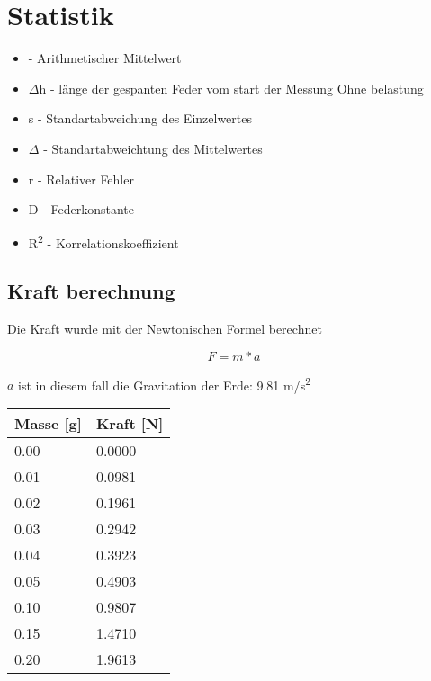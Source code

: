 \documentclass[../main.tex]{subfiles} %
\begin{document}
\section{Statistik}\label{sec:statistik}

\begin{itemize}ß
    \item {} - Arithmetischer Mittelwert
    \item $\Delta$h - länge der gespanten Feder vom start der Messung Ohne belastung
    \item s - Standartabweichung des Einzelwertes
    \item $\Delta$ - Standartabweichtung des Mittelwertes
    \item r - Relativer Fehler
    \item D - Federkonstante
    \item R\textsuperscript{2} - Korrelationskoeffizient
\end{itemize}

\subsection{Kraft berechnung}\label{subsec:force-calculation}

Die Kraft wurde mit der Newtonischen Formel berechnet

$$ F = m * a $$

$a$ ist in diesem fall die Gravitation der Erde: 9.81 m/s\textsuperscript{2}

\begin{center}
    \begin{tabular}{ |l|l| } \hline\rowcolor{Gray!50}
        Masse [g] & Kraft [N] \\\hline
        0.00      & 0.0000    \\\hline
        0.01      & 0.0981    \\\hline
        0.02      & 0.1961    \\\hline
        0.03      & 0.2942    \\\hline
        0.04      & 0.3923    \\\hline
        0.05      & 0.4903    \\\hline
        0.10      & 0.9807    \\\hline
        0.15      & 1.4710    \\\hline
        0.20      & 1.9613    \\\hline
    \end{tabular}
\end{center}
\end{document}
